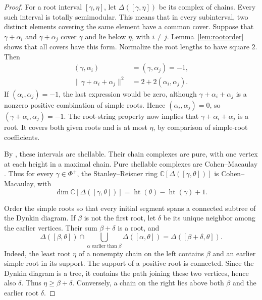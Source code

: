 \documentclass[12pt]{article}
\theoremstyle{definition}
\DeclareMathOperator{\height}{ht}
\newcommand{\C}{\mathbb C}
\begin{document}
\begin{proof}
    For a root interval $[\gamma,\eta]$, let $\Delta([\gamma,\eta])$ be its complex of chains. Every such interval is totally semimodular. This means that in every subinterval, two distinct elements covering the same element have a common cover. Suppose that $\gamma+\alpha_i$ and $\gamma+\alpha_j$ cover $\gamma$ and lie below $\eta$, with $i\ne j$. Lemma~\ref{lem:rootorder} shows that all covers have this form. Normalize the root lengths to have square $2$. Then
    \begin{align*}
        (\gamma,\alpha_i)&=(\gamma,\alpha_j)=-1,\\
        \|\gamma+\alpha_i+\alpha_j\|^2&=2+2(\alpha_i,\alpha_j).
    \end{align*}
    If $(\alpha_i,\alpha_j)=-1$, the last expression would be zero, although $\gamma+\alpha_i+\alpha_j$ is a nonzero positive combination of simple roots. Hence $(\alpha_i,\alpha_j)=0$, so $(\gamma+\alpha_i,\alpha_j)=-1$. The root-string property now implies that $\gamma+\alpha_i+\alpha_j$ is a root. It covers both given roots and is at most $\eta$, by comparison of simple-root coefficients.

    By \cite[Corollary~5.2]{BW83}, these intervals are shellable. Their chain complexes are pure, with one vertex at each height in a maximal chain. Pure shellable complexes are Cohen--Macaulay \cite[\S5]{Sta77}. Thus for every $\gamma\in\Phi^+$, the Stanley--Reisner ring $\C[\Delta([\gamma,\theta])]$ is Cohen--Macaulay, with
    $$
        \dim\C[\Delta([\gamma,\theta])]
        =\height(\theta)-\height(\gamma)+1.
    $$

    Order the simple roots so that every initial segment spans a connected subtree of the Dynkin diagram. If $\beta$ is not the first root, let $\delta$ be its unique neighbor among the earlier vertices. Their sum $\beta+\delta$ is a root, and
    \begin{equation}\label{eq:tree-intersection}
        \Delta([\beta,\theta])\cap
        \bigcup_{\alpha\text{ earlier than }\beta}\Delta([\alpha,\theta])
        =\Delta([\beta+\delta,\theta]).
    \end{equation}
    Indeed, the least root $\eta$ of a nonempty chain on the left contains $\beta$ and an earlier simple root in its support. The support of a positive root is connected. Since the Dynkin diagram is a tree, it contains the path joining these two vertices, hence also $\delta$. Thus $\eta\geq\beta+\delta$. Conversely, a chain on the right lies above both $\beta$ and the earlier root $\delta$.


\end{proof}
\end{document}
